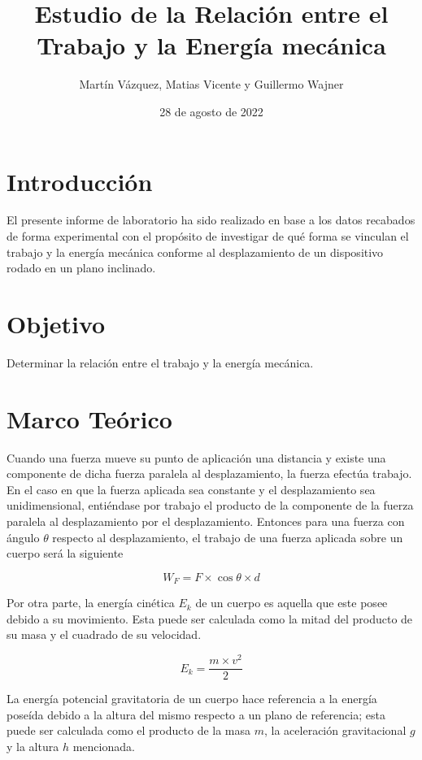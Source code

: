 \documentclass{article}
\title{Estudio de la Relación entre el Trabajo y la Energía mecánica}
\author{Martín Vázquez, Matias Vicente y Guillermo Wajner}
\date{28 de agosto de 2022}
\begin{document}
\maketitle

\section{Introducci\'{o}n}

El presente informe de laboratorio ha sido realizado en base a los datos recabados de forma experimental con el propósito de investigar de qué forma se vinculan el trabajo y la energía mecánica conforme al desplazamiento de un dispositivo rodado en un plano inclinado.

\section{Objetivo}

Determinar la relación entre el trabajo y la energía mecánica.

\section{Marco Te\'{o}rico}

Cuando una fuerza mueve su punto de aplicación una distancia y existe una componente de dicha fuerza paralela al desplazamiento, la fuerza efectúa trabajo. En el caso en que la fuerza aplicada sea constante y el desplazamiento sea unidimensional, entiéndase por trabajo el producto de la componente de la fuerza paralela al desplazamiento por el desplazamiento. Entonces para una fuerza con ángulo $\theta$ respecto al desplazamiento, el trabajo de una fuerza aplicada sobre un cuerpo será la siguiente

\begin{equation}
W_F =F \times \cos \theta \times d
\label{equation:W}
\end{equation}

Por otra parte, la energía cinética $E_k$ de un cuerpo es aquella que este posee debido a su movimiento. Esta puede ser calculada como la mitad del producto de su masa y el cuadrado de su velocidad.

\begin{equation}
E_k = \frac{m\times v^2}{2}
\label{equation:k}
\end{equation}

\pagebreak

La energía potencial gravitatoria de un cuerpo hace referencia a la energía poseída debido a la altura del mismo respecto a un plano de referencia; esta puede ser calculada como el producto de la masa $m$, la aceleración gravitacional $g$ y la altura $h$ mencionada.
\end{document}
